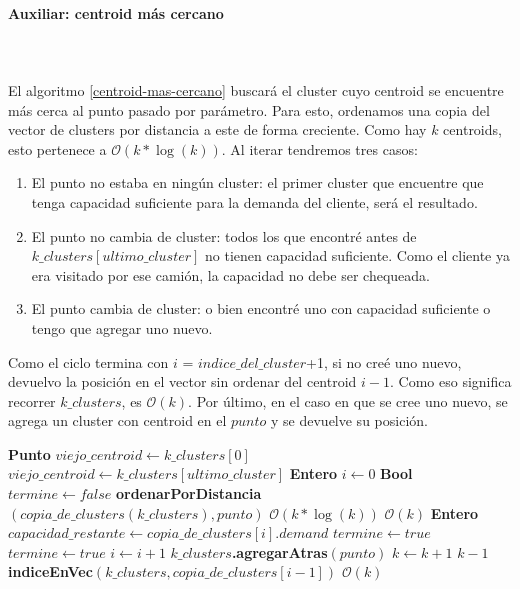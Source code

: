 \paragraph{Auxiliar: centroid más cercano}\hspace{0pt} \\
\\
El algoritmo \ref{centroid-mas-cercano} buscará el cluster cuyo centroid se encuentre más cerca al punto pasado por parámetro. Para esto, ordenamos una copia del vector de clusters por distancia a este de forma creciente. Como hay $k$ centroids, esto pertenece a $\mathcal{O}(k*\log(k))$.  Al iterar tendremos tres casos:
\begin{enumerate}
	\item El punto no estaba en ningún cluster: el primer cluster que encuentre que tenga capacidad suficiente para la demanda del cliente, será el resultado.
	\item El punto no cambia de cluster: todos los que encontré antes de $k\_clusters[ultimo\_cluster]$ no tienen capacidad suficiente. Como el cliente ya era visitado por ese camión, la capacidad no debe ser chequeada.
	\item El punto cambia de cluster: o bien encontré uno con capacidad suficiente o tengo que agregar uno nuevo.
\end{enumerate} 
Como el ciclo termina con $i$ = $indice\_del\_cluster$+1, si no creé uno nuevo, devuelvo la posición en el vector sin ordenar del centroid $i-1$. Como eso significa recorrer $k\_clusters$, es $\mathcal{O}(k)$. Por último, en el caso en que se cree uno nuevo, se agrega un cluster con centroid en el $punto$ y se devuelve su posición.
\\

\begin{algorithm}[H]
	\caption{\Comment $\mathcal{O}(k*\log(k))$}
	\label{centroid-mas-cercano}
	\begin{algorithmic}[1]
		\State \textbf{Punto } $viejo\_centroid \gets k\_clusters[0]$
		\State $viejo\_centroid \gets k\_clusters[ultimo\_cluster]$
		\EndIf 
		\State \textbf{Entero } $i \gets 0$
		\State \textbf{Bool } $termine \gets false$
		\State \textbf{ordenarPorDistancia}$(copia\_de\_clusters(k\_clusters), punto)$ \Comment $\mathcal{O}(k*\log(k))$
		\Statex
		 \Comment $\mathcal{O}(k)$
		\State \textbf{Entero } $capacidad\_restante \gets copia\_de\_clusters[i].demand$ 
		\State $termine \gets true$
		\EndIf
		\Else
		\State $termine \gets true$
		\EndIf
		\State $i \gets i+1$
		\EndWhile
		\Statex
		\State $k\_clusters$\textbf{.agregarAtras}$(punto)$
		\State $k \gets k+1$
		\State \Return $k-1$
		\EndIf
		\State \Return \textbf{indiceEnVec}$(k\_clusters, copia\_de\_clusters[i-1])$  \Comment $\mathcal{O}(k)$
		\EndFunction
	\end{algorithmic}
\end{algorithm}

